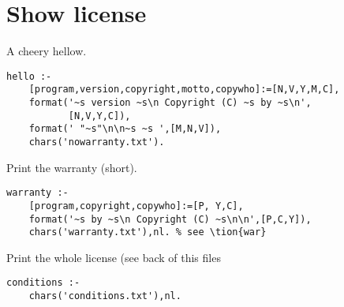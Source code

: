 \section{ Show license 
}
A cheery hellow.
\begin{Verbatim}
hello :- 
	[program,version,copyright,motto,copywho]:=[N,V,Y,M,C],
	format('~s version ~s\n Copyright (C) ~s by ~s\n',
	       [N,V,Y,C]),
	format(' "~s"\n\n~s ~s ',[M,N,V]),
	chars('nowarranty.txt'). 
\end{Verbatim}
Print the warranty (short).
\begin{Verbatim}
warranty :-
	[program,copyright,copywho]:=[P, Y,C],
	format('~s by ~s\n Copyright (C) ~s\n\n',[P,C,Y]),
	chars('warranty.txt'),nl. % see \tion{war}
\end{Verbatim}
Print the whole license (see back of this files
\begin{Verbatim}
conditions :-
	chars('conditions.txt'),nl.
\end{Verbatim}
